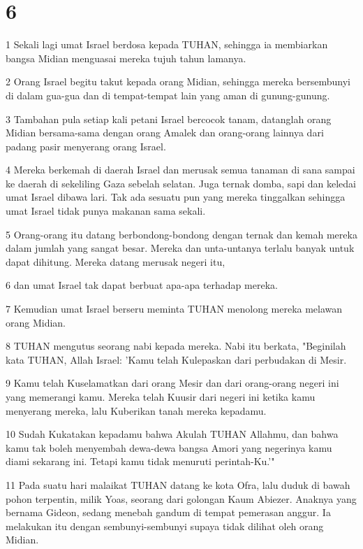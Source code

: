 \chapter{6}

\par 1 Sekali lagi umat Israel berdosa kepada TUHAN, sehingga ia membiarkan bangsa Midian menguasai mereka tujuh tahun lamanya.
\par 2 Orang Israel begitu takut kepada orang Midian, sehingga mereka bersembunyi di dalam gua-gua dan di tempat-tempat lain yang aman di gunung-gunung.
\par 3 Tambahan pula setiap kali petani Israel bercocok tanam, datanglah orang Midian bersama-sama dengan orang Amalek dan orang-orang lainnya dari padang pasir menyerang orang Israel.
\par 4 Mereka berkemah di daerah Israel dan merusak semua tanaman di sana sampai ke daerah di sekeliling Gaza sebelah selatan. Juga ternak domba, sapi dan keledai umat Israel dibawa lari. Tak ada sesuatu pun yang mereka tinggalkan sehingga umat Israel tidak punya makanan sama sekali.
\par 5 Orang-orang itu datang berbondong-bondong dengan ternak dan kemah mereka dalam jumlah yang sangat besar. Mereka dan unta-untanya terlalu banyak untuk dapat dihitung. Mereka datang merusak negeri itu,
\par 6 dan umat Israel tak dapat berbuat apa-apa terhadap mereka.
\par 7 Kemudian umat Israel berseru meminta TUHAN menolong mereka melawan orang Midian.
\par 8 TUHAN mengutus seorang nabi kepada mereka. Nabi itu berkata, "Beginilah kata TUHAN, Allah Israel: 'Kamu telah Kulepaskan dari perbudakan di Mesir.
\par 9 Kamu telah Kuselamatkan dari orang Mesir dan dari orang-orang negeri ini yang memerangi kamu. Mereka telah Kuusir dari negeri ini ketika kamu menyerang mereka, lalu Kuberikan tanah mereka kepadamu.
\par 10 Sudah Kukatakan kepadamu bahwa Akulah TUHAN Allahmu, dan bahwa kamu tak boleh menyembah dewa-dewa bangsa Amori yang negerinya kamu diami sekarang ini. Tetapi kamu tidak menuruti perintah-Ku.'"
\par 11 Pada suatu hari malaikat TUHAN datang ke kota Ofra, lalu duduk di bawah pohon terpentin, milik Yoas, seorang dari golongan Kaum Abiezer. Anaknya yang bernama Gideon, sedang menebah gandum di tempat pemerasan anggur. Ia melakukan itu dengan sembunyi-sembunyi supaya tidak dilihat oleh orang Midian.
